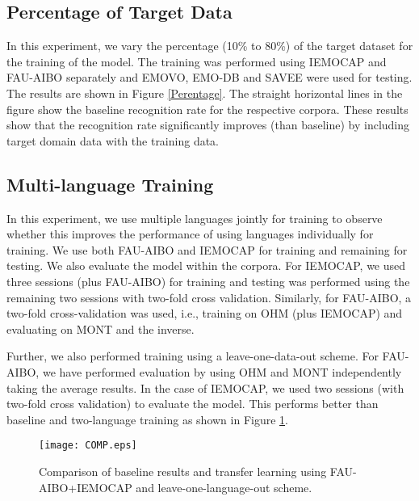 \documentclass[a4paper]{article}
\newcommand*{\RR}[1]{\textcolor{purple}{#1}}
\begin{document}
\subsection{Percentage of Target Data}

In this experiment, we vary the percentage (10\% to 80\%) of the target dataset for the training of the model. The training was performed using IEMOCAP and FAU-AIBO separately and EMOVO, EMO-DB and SAVEE were used for testing. The results are shown in Figure \ref{Perentage}. The straight horizontal lines in the figure show the baseline recognition rate for the respective corpora. These results show that the recognition rate significantly improves (than baseline) by including target domain data with the training data.


\subsection{Multi-language Training}

In this experiment, we use multiple languages jointly for training to observe whether this improves the performance of using languages individually for training. We use both FAU-AIBO and IEMOCAP for training and remaining for testing. We also evaluate the model within the corpora. For IEMOCAP, we used three sessions (plus FAU-AIBO) for training  and testing was performed using the remaining two sessions with two-fold cross validation. Similarly, for FAU-AIBO, a two-fold cross-validation was used, i.e., training on OHM (plus IEMOCAP) and evaluating on MONT and the inverse.


Further, we also performed training using a leave-one-data-out scheme. For FAU-AIBO, we have performed evaluation by using OHM and MONT independently taking the average results. In the case of IEMOCAP, we used two sessions (with two-fold cross validation) to evaluate the model. This performs better than baseline and two-language training as shown in Figure \ref{fig:G2}. %

\begin{figure}[!ht]
\centering
\captionsetup{justification=centering}
\centerline{\texttt{[image: COMP.eps]}}
\caption{Comparison of baseline results and transfer learning using FAU-AIBO+IEMOCAP and leave-one-language-out scheme.}
\label{fig:G2}
\end{figure}
\end{document}

